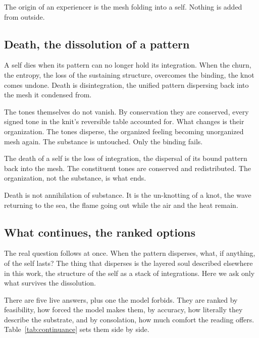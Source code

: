 \begin{principle}
The origin of an experiencer is the mesh folding into a self. Nothing is added from outside.
\end{principle}

\subsection{Death, the dissolution of a pattern}

A self dies when its pattern can no longer hold its integration. When the churn, the entropy, the loss of the sustaining structure, overcomes the binding, the knot comes undone. Death is disintegration, the unified pattern dispersing back into the mesh it condensed from.

The tones themselves do not vanish. By conservation they are conserved, every signed tone in the knit's reversible table accounted for. What changes is their organization. The tones disperse, the organized feeling becoming unorganized mesh again. The substance is untouched. Only the binding fails.

\begin{definition}
The death of a self is the loss of integration, the dispersal of its bound pattern back into the mesh. The constituent tones are conserved and redistributed. The organization, not the substance, is what ends.
\end{definition}

\begin{principle}
Death is not annihilation of substance. It is the un-knotting of a knot, the wave returning to the sea, the flame going out while the air and the heat remain.
\end{principle}

\subsection{What continues, the ranked options}

The real question follows at once. When the pattern disperses, what, if anything, of the self lasts? The thing that disperses is the layered soul described elsewhere in this work, the structure of the self as a stack of integrations. Here we ask only what survives the dissolution.

There are five live answers, plus one the model forbids. They are ranked by feasibility, how forced the model makes them, by accuracy, how literally they describe the substrate, and by consolation, how much comfort the reading offers. Table~\ref{tab:continuance} sets them side by side.

